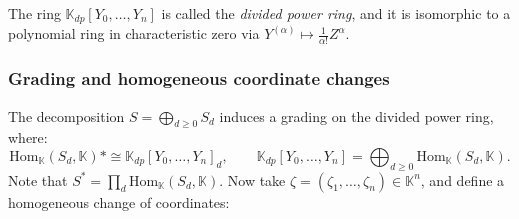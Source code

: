 \documentclass[a4paper,11p]{amsart}
\newtheorem{prop0}[defn0]{Proposition}
\newtheorem{example0}[defn0]{Example}
\newenvironment{proposition}{\bigskip \begin{prop0}}{\end{prop0}}
\newenvironment{example}{ \begin{example0}\rm}{\end{example0}}
\newcommand{\K}{\mathbb K}
\begin{document}
The ring $\mathbb{K}_{dp}[Y_0,\ldots,Y_n]$ is called the \emph{divided power ring}, and it is isomorphic to a polynomial ring in characteristic zero via $Y^{(\alpha)} \mapsto \frac{1}{\alpha!} Z^\alpha$.









\subsubsection{Grading and homogeneous coordinate changes}

The decomposition $ S = \bigoplus_{d \geq 0} S_d $ induces a grading on the divided power ring, where:
\[
\mathrm{Hom}_{\mathbb{K}}(S_d, \mathbb{K})* \cong \K_{dp}[Y_0,\ldots,Y_n]_d, \qquad
\K_{dp}[Y_0,\ldots,Y_n] = \bigoplus_{d \geq 0} \mathrm{Hom}_{\mathbb{K}}(S_d, \mathbb{K}).
\]
Note that $S^*=\prod_d \mathrm{Hom}_{\mathbb{K}}(S_d, \mathbb{K})$. Now take $ \zeta = (\zeta_1, \ldots, \zeta_n) \in \K^n $, and define a homogeneous change of coordinates:
\end{document}
